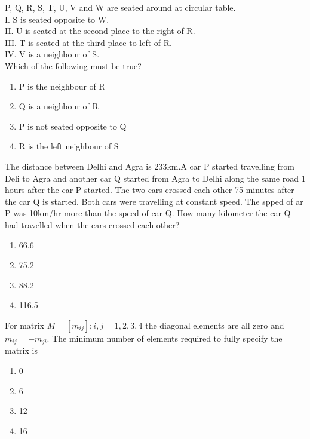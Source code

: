 \item P, Q, R, S, T, U, V and W are seated around at circular table.\\
    I. S is seated opposite to W. \\
    II. U is seated at the second place to the right of R.\\
    III. T is seated at the third place to left of R.\\
    IV. V is a neighbour of S.\\
Which of the following must be true?
\begin{enumerate}
    \item P is the neighbour of R
    \item Q is a neighbour of R
    \item P is not seated opposite to Q
    \item R is the left neighbour of S
\end{enumerate}

\item The distance between Delhi and Agra is 233km.A car P started travelling from Deli to Agra and another car Q started from Agra to Delhi along the same road 1 hours after the car P started. The two cars crossed each other 75 minutes after the car Q is started. Both cars were travelling at constant speed. The spped of ar P was 10km/hr more than the speed of car Q. How many kilometer the car Q had travelled when the cars crossed each other?
\begin{enumerate}
    \item 66.6
    \item 75.2
    \item 88.2
    \item 116.5
\end{enumerate}

\item For matrix $M = [m_{ij}]; i,j = 1,2,3,4$ the diagonal elements are all zero and $m_{ij} = -m_{ji}$. The minimum number of elements required to fully specify the matrix is \underline{\hspace{2cm}}
\begin{enumerate}
    \item 0
    \item 6
    \item 12
    \item 16
\end{enumerate}

